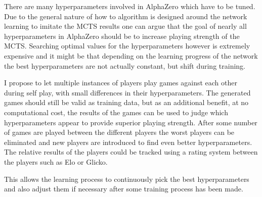\documentclass[12pt,onecolumn,oneside,titlepage]{article}
\begin{document}
There are many hyperparameters involved in AlphaZero which have to be tuned. Due to the general nature of how to algorithm is designed around the network learning to imitate the MCTS results one can argue that the goal of
nearly all hyperparameters in AlphaZero should be to increase playing strength of the MCTS. Searching optimal values for the hyperparameters however is extremely expensive and it might be that depending on the learning progress of the network 
the best hyperparameters are not actually constant, but shift during training.

I propose to let multiple instances of players play games against each other during self play, with small differences in their hyperparameters. The generated games should still be valid as training data, but as an additional benefit, at no computational cost,
the results of the games can be used to judge which hyperparameters appear to provide superior playing strength. After some number of games are played between the different players the worst players can be eliminated and new players are introduced to find even better hyperparameters.
The relative results of the players could be tracked using a rating system between the players such as Elo or Glicko.

This allows the learning process to continuously pick the best hyperparameters and also adjust them if necessary after some training process has been made.





\end{document}
